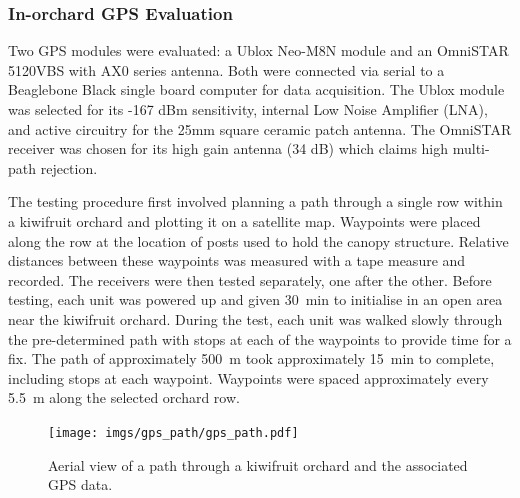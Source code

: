 \documentclass[preprint,authoryear,12pt]{elsarticle}
\begin{document}

    \subsubsection{In-orchard GPS Evaluation}
        Two GPS modules were evaluated: a Ublox Neo-M8N module and an OmniSTAR 5120VBS with AX0 series antenna.
    	Both were connected via serial to a Beaglebone Black single board computer for data acquisition.
        The Ublox module was selected for its -167 dBm sensitivity, internal Low Noise Amplifier (LNA), and active circuitry for the 25mm square ceramic patch antenna.
        The OmniSTAR receiver was chosen for its high gain antenna (34 dB) which claims high multi-path rejection.

        The testing procedure first involved planning a path through a single row within a kiwifruit orchard and plotting it on a satellite map.
        Waypoints were placed along the row at the location of posts used to hold the canopy structure.
        Relative distances between these waypoints was measured with a tape measure and recorded.
        The receivers were then tested separately, one after the other.
        Before testing, each unit was powered up and given \SI{30}{\minute} to initialise in an open area near the kiwifruit orchard.
        During the test, each unit was walked slowly through the pre-determined path with stops at each of the waypoints to provide time for a fix.
        The path of approximately \SI{500}{\meter} took approximately \SI{15}{\minute} to complete, including stops at each waypoint.
        Waypoints were spaced approximately every \SI{5.5}{\meter} along the selected orchard row.

        \begin{figure}[htb]
            \centering
            \texttt{[image: imgs/gps\_path/gps\_path.pdf]}
            \caption{
                Aerial view of a path through a kiwifruit orchard and the associated GPS data.
            }
            \label{fig:gpsResults}
        \end{figure}
\end{document}

